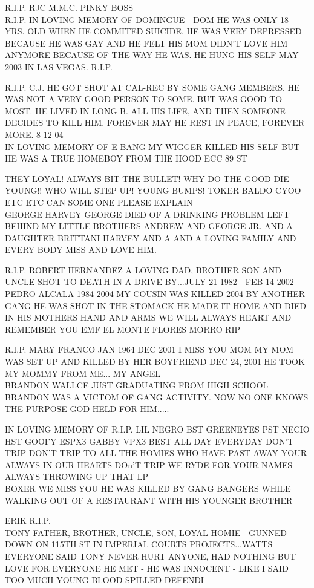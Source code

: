\documentclass[10pt,letterpaper]{article}
\begin{document}
R.I.P. RJC M.M.C. PINKY BOSS\\
R.I.P. IN LOVING MEMORY OF DOMINGUE {-} DOM HE WAS ONLY 18 YRS. OLD WHEN HE COMMITED SUICIDE.  HE WAS VERY DEPRESSED BECAUSE HE WAS GAY AND HE FELT HIS MOM DIDN'T LOVE HIM ANYMORE BECAUSE OF THE WAY HE WAS.  HE HUNG HIS SELF MAY 2003 IN LAS VEGAS.  R.I.P.

R.I.P. C.J. HE GOT SHOT AT CAL{-}REC BY SOME GANG MEMBERS.  HE WAS NOT A VERY GOOD PERSON TO SOME.  BUT WAS GOOD TO MOST.  HE LIVED IN LONG B. ALL HIS LIFE, AND THEN SOMEONE DECIDES TO KILL HIM.  FOREVER MAY HE REST IN PEACE, FOREVER MORE.  8 12 04\\
IN LOVING MEMORY OF E{-}BANG MY WIGGER KILLED HIS SELF BUT HE WAS A TRUE HOMEBOY FROM THE HOOD ECC 89 ST

THEY LOYAL!  ALWAYS BIT THE BULLET!  WHY DO THE GOOD DIE YOUNG!! WHO WILL STEP UP!  YOUNG BUMPS! TOKER BALDO CYOO ETC ETC CAN SOME ONE PLEASE EXPLAIN\\
GEORGE HARVEY GEORGE DIED OF A DRINKING PROBLEM LEFT BEHIND MY LITTLE BROTHERS ANDREW AND GEORGE JR. AND A DAUGHTER BRITTANI HARVEY AND A AND A LOVING FAMILY AND EVERY BODY MISS AND LOVE HIM.

R.I.P. ROBERT HERNANDEZ A LOVING DAD, BROTHER SON AND UNCLE SHOT TO DEATH IN A DRIVE BY...JULY 21 1982 {-} FEB 14 2002\\
PEDRO ALCALA 1984{-}2004 MY COUSIN WAS KILLED 2004 BY ANOTHER GANG HE WAS SHOT IN THE STOMACK HE MADE IT HOME AND DIED IN HIS MOTHERS HAND AND ARMS WE WILL ALWAYS HEART AND REMEMBER YOU EMF EL MONTE FLORES MORRO RIP

R.I.P. MARY FRANCO JAN 1964 DEC 2001 I MISS YOU MOM MY MOM WAS SET UP AND KILLED BY HER BOYFRIEND DEC 24, 2001 HE TOOK MY MOMMY FROM ME... MY ANGEL\\
BRANDON WALLCE JUST GRADUATING FROM HIGH SCHOOL BRANDON WAS A VICTOM OF GANG ACTIVITY.  NOW NO ONE KNOWS THE PURPOSE GOD HELD FOR HIM.....

IN LOVING MEMORY OF R.I.P. LIL NEGRO BST GREENEYES PST NECIO HST GOOFY ESPX3 GABBY VPX3 BEST ALL DAY EVERYDAY DON'T TRIP DON'T TRIP TO ALL THE HOMIES WHO HAVE PAST AWAY YOUR ALWAYS IN OUR HEARTS DOn'T TRIP WE RYDE FOR YOUR NAMES ALWAYS THROWING UP THAT LP\\
BOXER WE MISS YOU HE WAS KILLED BY GANG BANGERS WHILE WALKING OUT OF A RESTAURANT WITH HIS YOUNGER BROTHER

ERIK R.I.P.\\
TONY FATHER, BROTHER, UNCLE, SON, LOYAL HOMIE {-} GUNNED DOWN ON 115TH ST IN IMPERIAL COURTS PROJECTS...WATTS EVERYONE SAID TONY NEVER HURT ANYONE, HAD NOTHING BUT LOVE FOR EVERYONE HE MET {-} HE WAS INNOCENT {-} LIKE I SAID TOO MUCH YOUNG BLOOD SPILLED DEFENDI
\end{document}
